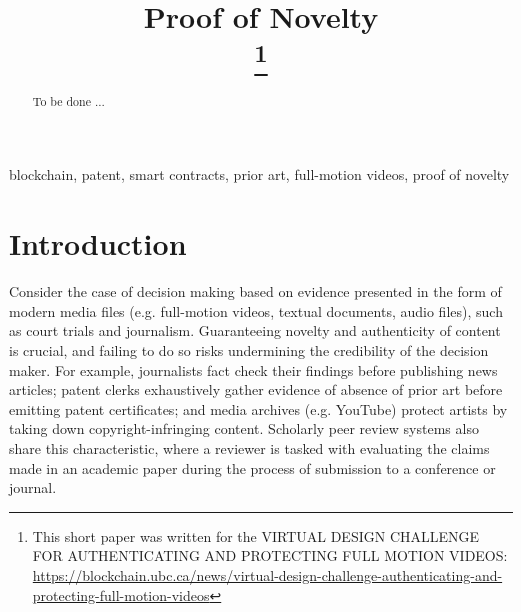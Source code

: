 \documentclass[conference]{IEEEtran}
\begin{document}
\title{Proof of Novelty\\
\thanks{This short paper was written for the VIRTUAL DESIGN CHALLENGE FOR AUTHENTICATING AND PROTECTING FULL MOTION VIDEOS: \url{https://blockchain.ubc.ca/news/virtual-design-challenge-authenticating-and-protecting-full-motion-videos}}
}

\author{
}

\maketitle

\begin{abstract}
To be done ...
\end{abstract}

\begin{IEEEkeywords}
blockchain, patent, smart contracts, prior art, full-motion videos, proof of novelty
\end{IEEEkeywords}

\section{Introduction}

Consider the case of decision making based on evidence presented in the form of modern media files (e.g. full-motion videos, textual documents, audio files), such as court trials and journalism. Guaranteeing novelty and authenticity of content  is crucial, and failing to do so risks undermining the credibility of the decision maker. For example, journalists fact check their findings before publishing news articles; patent clerks exhaustively gather evidence of absence of prior art before emitting patent certificates; and media archives (e.g. YouTube) protect artists by taking down copyright-infringing content. Scholarly peer review systems also share this characteristic, where a reviewer is tasked with evaluating the claims made in an academic paper during the process of submission to a conference or journal. 
\end{document}
